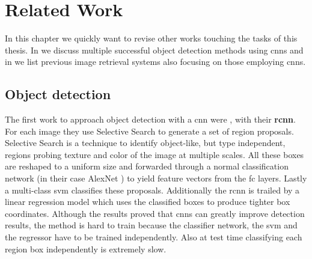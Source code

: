 %
\chapter{Related Work}
\label{sec:related}
In this chapter we quickly want to revise other works touching the tasks of this thesis. In  we discuss multiple successful object detection methods using \glspl{cnn} and in  we list previous image retrieval systems also focusing on those employing \glspl{cnn}.

\section{Object detection}
\label{sec:related:detection}
The first work to approach object detection with a \gls{cnn} were \citet{girshick_rich_2014}, with their \textbf{\gls{rcnn}}. For each image they use Selective Search to generate a set of region proposals. Selective Search is a technique to identify object-like, but type independent, regions probing texture and color of the image at multiple scales. All these boxes are reshaped to a uniform size and forwarded through a normal classification network (in their case AlexNet \citep{krizhevsky_imagenet_2012}) to yield feature vectors from the \gls{fc} layers. Lastly a multi-class \gls{svm} classifies these proposals. Additionally the \gls{rcnn} is trailed by a linear regression model which uses the classified boxes to produce tighter box coordinates. Although the results proved that \glspl{cnn} can greatly improve detection results, the method is hard to train because the classifier network, the \gls{svm} and the regressor have to be trained independently. Also at test time classifying each region box independently is extremely slow.

